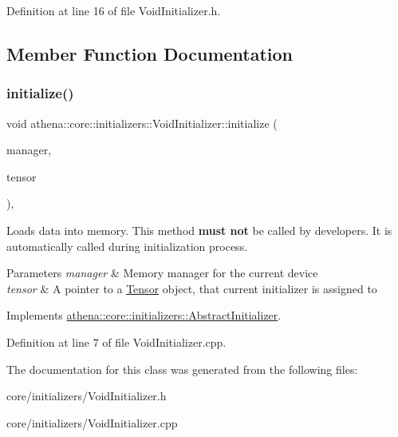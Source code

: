 Definition at line 16 of file Void\+Initializer.\+h.



\subsection{Member Function Documentation}
\mbox{\label{classathena_1_1core_1_1initializers_1_1_void_initializer_adcb637175e8cad5841cb21e53e0e138f}} 
\subsubsection{\texorpdfstring{initialize()}{initialize()}}
{\footnotesize\ttfamily void athena\+::core\+::initializers\+::\+Void\+Initializer\+::initialize (\begin{DoxyParamCaption}\item[{\mbox{\hyperlink{classathena_1_1backend_1_1_abstract_memory_manager}{athena\+::backend\+::\+Abstract\+Memory\+Manager}} $\ast$}]{manager,  }\item[{\mbox{\hyperlink{classathena_1_1core_1_1_tensor}{Tensor}} $\ast$}]{tensor }\end{DoxyParamCaption})\hspace{0.3cm}{\ttfamily [override]}, {\ttfamily [virtual]}}

Loads data into memory. This method {\bfseries must not} be called by developers. It is automatically called during initialization process. 
\begin{DoxyParams}{Parameters}
{\em manager} & Memory manager for the current device \\
\hline
{\em tensor} & A pointer to a \mbox{\hyperlink{classathena_1_1core_1_1_tensor}{Tensor}} object, that current initializer is assigned to \\
\hline
\end{DoxyParams}


Implements \mbox{\hyperlink{classathena_1_1core_1_1initializers_1_1_abstract_initializer_a9c0f0c57add306c9da8ffe8797532f62}{athena\+::core\+::initializers\+::\+Abstract\+Initializer}}.



Definition at line 7 of file Void\+Initializer.\+cpp.



The documentation for this class was generated from the following files\+:\begin{DoxyCompactItemize}
\item 
core/initializers/Void\+Initializer.\+h\item 
core/initializers/Void\+Initializer.\+cpp\end{DoxyCompactItemize}
